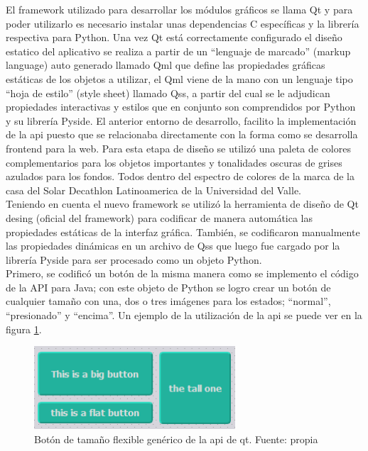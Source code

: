 El framework utilizado para desarrollar los módulos gráficos se llama Qt y para poder utilizarlo es necesario instalar unas dependencias C específicas y la librería respectiva para Python. Una vez Qt está correctamente configurado el diseño estatico del aplicativo se realiza a partir de un ``lenguaje de marcado'' (markup language) auto generado llamado Qml que define las propiedades gráficas estáticas de los objetos a utilizar, el Qml viene de la mano con un lenguaje tipo ``hoja de estilo'' (style sheet) llamado Qss, a partir del cual se le adjudican propiedades interactivas y estilos que en conjunto son comprendidos por Python y su librería Pyside. El anterior entorno de desarrollo, facilito la implementación de la api puesto que se relacionaba directamente con la forma como se desarrolla frontend para la web.
Para esta etapa de diseño se utilizó una paleta de colores complementarios para los objetos importantes y tonalidades oscuras de grises azulados para los fondos. Todos dentro del espectro de colores de la marca de la casa del Solar Decathlon Latinoamerica de la Universidad del Valle.
\vspace{0.5cm}\\
Teniendo en cuenta el nuevo framework se utilizó la herramienta de diseño de Qt desing (oficial del framework) para codificar de manera automática las propiedades estáticas de la interfaz gráfica. También, se codificaron manualmente las propiedades dinámicas en un archivo de Qss que luego fue cargado por la librería Pyside para ser procesado como un objeto Python. 
\vspace{0.5cm}\\
Primero, se codificó un botón de la misma manera como se implemento el código de la API para Java; con este objeto de Python se logro crear un botón de cualquier tamaño con una, dos o tres imágenes para los estados; ``normal'', ``presionado'' y ``encima''. Un ejemplo de la utilización de la api se puede ver en la figura \ref{fig_19}.
\vspace{0.5cm}\\
\begin{figure}[htbp]
	\centerline{\includegraphics[width=7.5cm]{./figuras/qt_button.png}}
	\caption{Botón de tamaño flexible genérico de la api de qt. Fuente: propia}
	\label{fig_19}
\end{figure}

